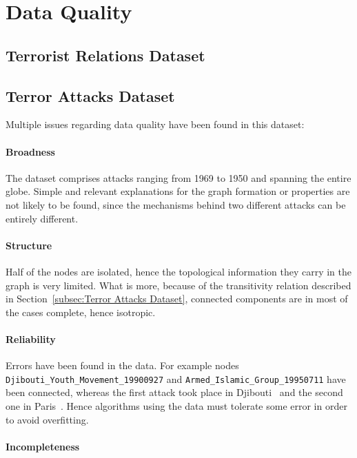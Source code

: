 \section{Data Quality}
\label{sec:DataQuality}

\subsection{Terrorist Relations Dataset}

\subsection{Terror Attacks Dataset}
\label{subsec:terror attack quality}
Multiple issues regarding data quality have been found in this dataset:

\paragraph{Broadness} 
The dataset comprises attacks ranging from 1969 to 1950 and spanning the entire globe. Simple and relevant explanations for the graph formation or properties are not likely to be found, since the mechanisms behind two different attacks can be entirely different.

\paragraph{Structure} 
Half of the nodes are isolated, hence the topological information they carry in the graph is very limited. What is more, because of the transitivity relation described in Section~\ref{subsec:Terror Attacks Dataset}, connected components are in most of the cases complete, hence isotropic. 

\paragraph{Reliability} 
Errors have been found in the data. For example nodes
 \texttt{Djibouti\_Youth\_Movement\_19900927} 
 and 
 \texttt{Armed\_Islamic\_Group\_19950711} 
 have been connected, whereas the first attack took place in Djibouti~\cite{amnesty1991} and the second one in Paris~\cite{nouvelObs2007}. Hence algorithms using the data must tolerate some error in order to avoid overfitting.

\paragraph{Incompleteness}
\cite{ZSG2006}